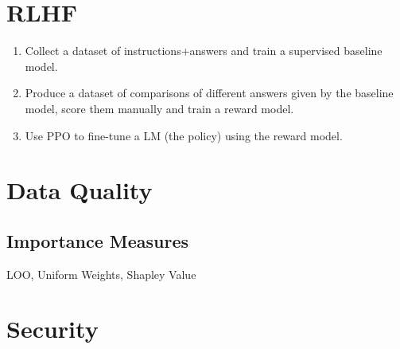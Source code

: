 \section{RLHF}
\begin{enumerate}[leftmargin=*]
      \item Collect a dataset of instructions+answers and train a supervised baseline model.
      \item Produce a dataset of comparisons of different answers given by the baseline model, score them manually and train a reward model.
      \item Use PPO to fine-tune a LM (the policy) using the reward model.
\end{enumerate}




\section{Data Quality}
\subsection*{Importance Measures}
LOO, Uniform Weights, Shapley Value

\section{Security}
